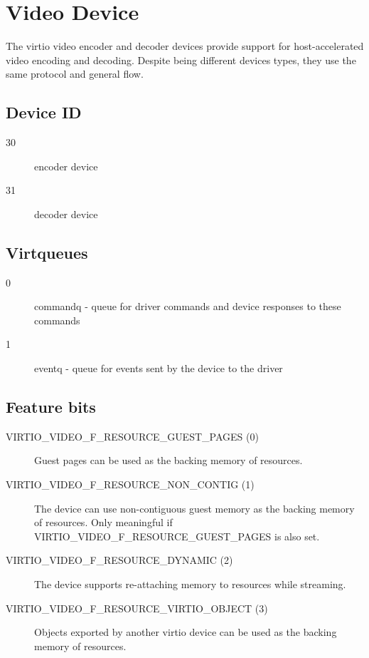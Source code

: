 \section{Video Device}\label{sec:Device Types / Video Device}

The virtio video encoder and decoder devices provide support for
host-accelerated video encoding and decoding. Despite being different
devices types, they use the same protocol and general flow.

\subsection{Device ID}\label{sec:Device Types / Video Device / Device ID}

\begin{description}
\item[30]
encoder device
\item[31]
decoder device
\end{description}

\subsection{Virtqueues}\label{sec:Device Types / Video Device / Virtqueues}

\begin{description}
\item[0]
commandq - queue for driver commands and device responses to these
commands
\item[1]
eventq - queue for events sent by the device to the driver
\end{description}

\subsection{Feature bits}\label{sec:Device Types / Video Device / Feature bits}

\begin{description}
\item[VIRTIO_VIDEO_F_RESOURCE_GUEST_PAGES (0)]
Guest pages can be used as the backing memory of resources.
\item[VIRTIO_VIDEO_F_RESOURCE_NON_CONTIG (1)]
The device can use non-contiguous guest memory as the backing memory of
resources. Only meaningful if VIRTIO_VIDEO_F_RESOURCE_GUEST_PAGES
is also set.
\item[VIRTIO_VIDEO_F_RESOURCE_DYNAMIC (2)]
The device supports re-attaching memory to resources while streaming.
\item[VIRTIO_VIDEO_F_RESOURCE_VIRTIO_OBJECT (3)]
Objects exported by another virtio device can be used as the backing
memory of resources.
\end{description}

